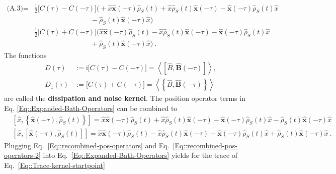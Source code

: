 	\begin{equation} \label{Eq::Expanded-Bath-Operators}
		\begin{split}
			\text{(A.3)} =	&\frac{1}{2} \Big[C(\tau) - C(-\tau) \Big] \Big ( +\hat{x} \boldsymbol{\hat{x}}(-\tau) \hat{\rho}_S(t) + \hat{x} \hat{\rho}_S(t) \boldsymbol{\hat{x}}(-\tau) - \boldsymbol{\hat{x}}(-\tau) \hat{\rho}_S(t) \hat{x}  \\
			& \qquad \qquad \qquad \qquad -  \hat{\rho}_S(t) \boldsymbol{\hat{x}}(-\tau) \hat{x} \Big ) \\
			& \frac{1}{2} \Big[C(\tau) + C(-\tau)\Big] \Big ( \hat{x} \boldsymbol{\hat{x}}(-\tau) \hat{\rho}_S(t) - \hat{x} \hat{\rho}_S(t) \boldsymbol{\hat{x}}(-\tau) - \boldsymbol{\hat{x}}(-\tau) \hat{\rho}_S(t) \hat{x} \\
			& \qquad \qquad \qquad \qquad + \hat{\rho}_S(t) \boldsymbol{\hat{x}}(-\tau) \hat{x} \Big) ~.
		\end{split}
	\end{equation}
	The functions
	\begin{align}
		D(\tau) &:=	\mathrm{i} \Big[C(\tau) - C(-\tau) \Big] =	\left\langle [\hat{B}, \boldsymbol{\hat{B}}(-\tau) ]  \right \rangle ,	\\
		D_1(\tau) &:= \Big[C(\tau) + C(-\tau)\Big]  =	\left \langle \left\{\hat{B}, \boldsymbol{\hat{B}}(-\tau) \right\} \right \rangle
	\end{align}
	are called the \textbf{dissipation and noise kernel}.
	The position operator terms in Eq. \eqref{Eq::Expanded-Bath-Operators} can be combined to
	\begin{align} \label{Eq::recombined-pos-operators}
		&\left[\hat{x}, \left\{\boldsymbol{\hat{x}}(-\tau),  \hat{\rho}_S(t)\right\}\right] =	\hat{x} \boldsymbol{\hat{x}}(-\tau) \hat{\rho}_S(t) + \hat{x} \hat{\rho}_S(t) \boldsymbol{\hat{x}}(-\tau) - \boldsymbol{\hat{x}}(-\tau) \hat{\rho}_S(t) \hat{x}
		-  \hat{\rho}_S(t) \boldsymbol{\hat{x}}(-\tau) \hat{x} \\
		&\left[\hat{x}, \left[\boldsymbol{\hat{x}}(-\tau),  \hat{\rho}_S(t)\right] \right] =	\hat{x} \boldsymbol{\hat{x}}(-\tau) \hat{\rho}_S(t) - \hat{x} \hat{\rho}_S(t) \boldsymbol{\hat{x}}(-\tau) - \boldsymbol{\hat{x}}(-\tau) \hat{\rho}_S(t) \hat{x}
		+  \hat{\rho}_S(t) \boldsymbol{\hat{x}}(-\tau) \hat{x}~.\label{Eq::recombined-pos-operators-2}
	\end{align}
	Plugging Eq.~\eqref{Eq::recombined-pos-operators} and Eq.~\eqref{Eq::recombined-pos-operators-2} into Eq.~\eqref{Eq::Expanded-Bath-Operators} yields for the trace of Eq.~\eqref{Eq::Trace-kernel-startpoint}
